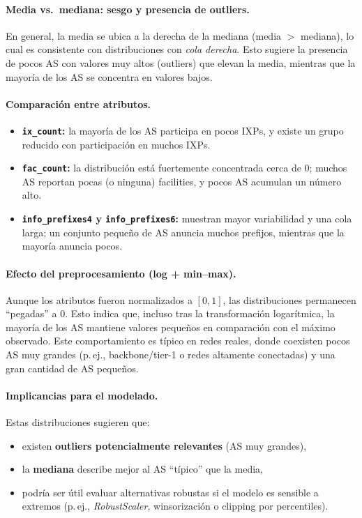 \paragraph{Media vs.\ mediana: sesgo y presencia de outliers.}
En general, la media se ubica a la derecha de la mediana (media $>$ mediana), lo cual es consistente con distribuciones con \emph{cola derecha}. Esto sugiere la presencia de pocos AS con valores muy altos (outliers) que elevan la media, mientras que la mayoría de los AS se concentra en valores bajos.

\paragraph{Comparación entre atributos.}
\begin{itemize}
    \item \textbf{\texttt{ix\_count}:} la mayoría de los AS participa en pocos IXPs, y existe un grupo reducido con participación en muchos IXPs.
    \item \textbf{\texttt{fac\_count}:} la distribución está fuertemente concentrada cerca de 0; muchos AS reportan pocas (o ninguna) facilities, y pocos AS acumulan un número alto.
    \item \textbf{\texttt{info\_prefixes4} y \texttt{info\_prefixes6}:} muestran mayor variabilidad y una cola larga; un conjunto pequeño de AS anuncia muchos prefijos, mientras que la mayoría anuncia pocos.
\end{itemize}

\paragraph{Efecto del preprocesamiento (log + min--max).}
Aunque los atributos fueron normalizados a $[0,1]$, las distribuciones permanecen ``pegadas'' a 0. Esto indica que, incluso tras la transformación logarítmica, la mayoría de los AS mantiene valores pequeños en comparación con el máximo observado. Este comportamiento es típico en redes reales, donde coexisten pocos AS muy grandes (p.\,ej., backbone/tier-1 o redes altamente conectadas) y una gran cantidad de AS pequeños.

\paragraph{Implicancias para el modelado.}
Estas distribuciones sugieren que:
\begin{itemize}
    \item existen \textbf{outliers potencialmente relevantes} (AS muy grandes),
    \item la \textbf{mediana} describe mejor al AS ``típico'' que la media,
    \item podría ser útil evaluar alternativas robustas si el modelo es sensible a extremos (p.\,ej., \emph{RobustScaler}, winsorización o clipping por percentiles).
\end{itemize}




